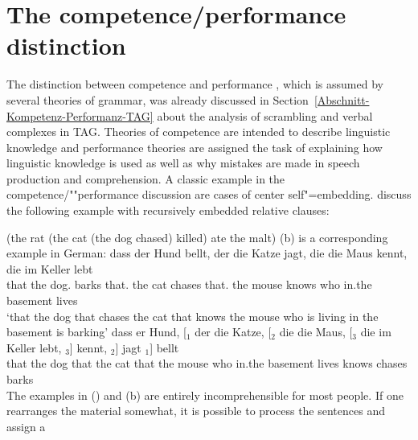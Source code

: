 
\chapter{The competence/performance distinction}
\label{Abschnitt-Diskussion-Performanz}\label{chap-competence-performance}

\begin{sloppypar}
The distinction\nocite{VL2006a} between competence and performance
\citep[Section~1.1]{Chomsky65a}, which is assumed by several theories of grammar, was already
discussed in Section~\ref{Abschnitt-Kompetenz-Performanz-TAG} about the analysis of scrambling and
verbal complexes in TAG. Theories of competence are
intended to describe linguistic knowledge and performance theories are assigned the task of
explaining how linguistic knowledge is used as well as why mistakes are made in speech production
and comprehension. A classic example in the competence/""performance discussion are cases of
center self"=embedding. \citet[]{CM63a} discuss the following example with
recursively embedded relative clauses: 
\end{sloppypar}
\ea
(the rat (the cat (the dog chased) killed) ate the malt)
\z
(b) is a corresponding example in German:
\eal
\ex 
\gll dass der Hund bellt, der die Katze jagt, die die Maus kennt, die im Keller lebt\\
     that the dog.\mas{} barks that.\mas{} the cat chases that.\fem{} the mouse knows who in.the basement lives\\
\glt `that the dog that chases the cat that knows the mouse who is living in the basement is barking'
\ex\label{Bsp-Selbsteinbettung} 
\gll dass er Hund, [$_1$ der die Katze, [$_2$ die die Maus, [$_3$ die im Keller lebt,  $_3$] kennt, $_2$] jagt $_1$] bellt\\
     that the dog {} that the cat {} that the mouse      {}    who in.the basement lives {} knows {} chases {} barks\\
\zl
%
\largerpage
The examples in () and (b) are entirely incomprehensible for most people.
If one rearranges the material somewhat, it is possible to process the sentences and assign a
